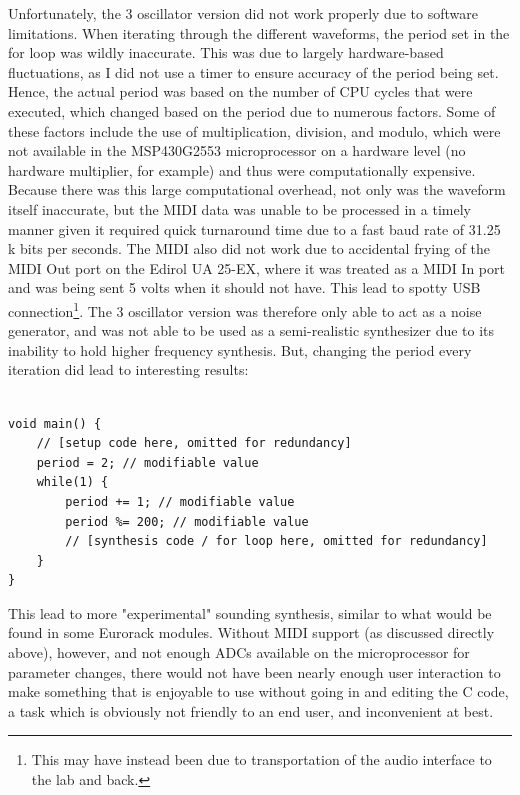 \documentclass[12pt]{article}
\begin{document}
Unfortunately, the 3 oscillator version did not work properly due to software limitations.
When iterating through the different waveforms, the period set in the for loop was wildly inaccurate.
This was due to largely hardware-based fluctuations, as I did not use a timer to ensure accuracy of the period being set.
Hence, the actual period was based on the number of CPU cycles that were executed, which changed based on the period due to numerous factors.
Some of these factors include the use of multiplication, division, and modulo, which were not available in the MSP430G2553 microprocessor on a hardware level (no hardware multiplier, for example) and thus were computationally expensive.
Because there was this large computational overhead, not only was the waveform itself inaccurate, but the MIDI data was unable to be processed in a timely manner given it required quick turnaround time due to a fast baud rate of 31.25 k bits per seconds. The MIDI also did not work due to accidental frying of the MIDI Out port on the Edirol UA 25-EX, where it was treated as a MIDI In port and was being sent 5 volts when it should not have. This lead to spotty USB connection\footnote{This may have instead been due to transportation of the audio interface to the lab and back.}.
The 3 oscillator version was therefore only able to act as a noise generator, and was not able to be used as a semi-realistic synthesizer due to its inability to hold higher frequency synthesis. But, changing the period every iteration did lead to interesting results:

\begin{lstlisting}

void main() {
    // [setup code here, omitted for redundancy]
    period = 2; // modifiable value
    while(1) {
        period += 1; // modifiable value
        period %= 200; // modifiable value
        // [synthesis code / for loop here, omitted for redundancy]
    }
}
\end{lstlisting}

This lead to more "experimental" sounding synthesis, similar to what would be found in some Eurorack modules. Without MIDI support (as discussed directly above), however, and not enough ADCs available on the microprocessor for parameter changes, there would not have been nearly enough user interaction to make something that is enjoyable to use without going in and editing the C code, a task which is obviously not friendly to an end user, and inconvenient at best. 
\end{document}
